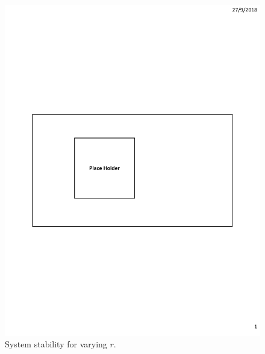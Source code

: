 \begin{figure}[h]
\begin{minipage}{0.18\linewidth}
		\includegraphics[width=\linewidth]{fig/PlaceHolder.pdf}
		\centerline{\dsrandom}
	\end{minipage}
	\caption{System stability for varying $r$.}
	\label{fig:vary-r-stability}
\end{figure}

